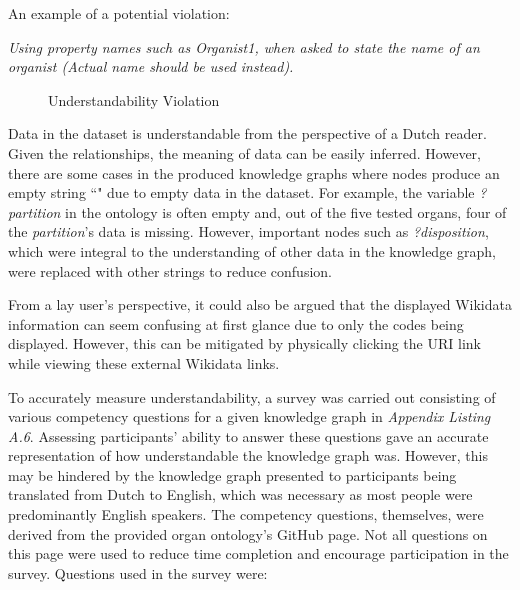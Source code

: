 \noindent An example of a potential violation: 
\vspace{-0.1cm}
\begin{displayquote}
    \textit{Using property names such as Organist1, when asked to state the name of an organist (Actual name should be used instead).}
\end{displayquote}

\begin{figure}[H]
\begin{center}
\end{center}
\vspace{-0.5cm}
\caption{Understandability Violation}
\end{figure}

Data in the dataset is understandable from the perspective of a Dutch reader. Given the relationships, the meaning of data can be easily inferred. However, there are some cases in the produced knowledge graphs where nodes produce an empty string ``" due to empty data in the dataset. For example, the variable \textit{?partition} in the ontology is often empty and, out of the five tested organs, four of the \textit{partition}'s data is missing. However, important nodes such as \textit{?disposition}, which were integral to the understanding of other data in the knowledge graph, were replaced with other strings to reduce confusion. 

From a lay user's perspective, it could also be argued that the displayed Wikidata information can seem confusing at first glance due to only the codes being displayed. However, this can be mitigated by physically clicking the URI link while viewing these external Wikidata links. 

To accurately measure understandability, a survey was carried out consisting of various competency questions for a given knowledge graph in \textit{Appendix Listing A.6}. Assessing participants' ability to answer these questions gave an accurate representation of how understandable the knowledge graph was. However, this may be hindered by the knowledge graph presented to participants being translated from Dutch to English, which was necessary as most people were predominantly English speakers. The competency questions, themselves, were derived from the provided organ ontology's GitHub page. Not all questions on this page were used to reduce time completion and encourage participation in the survey. Questions used in the survey were:

